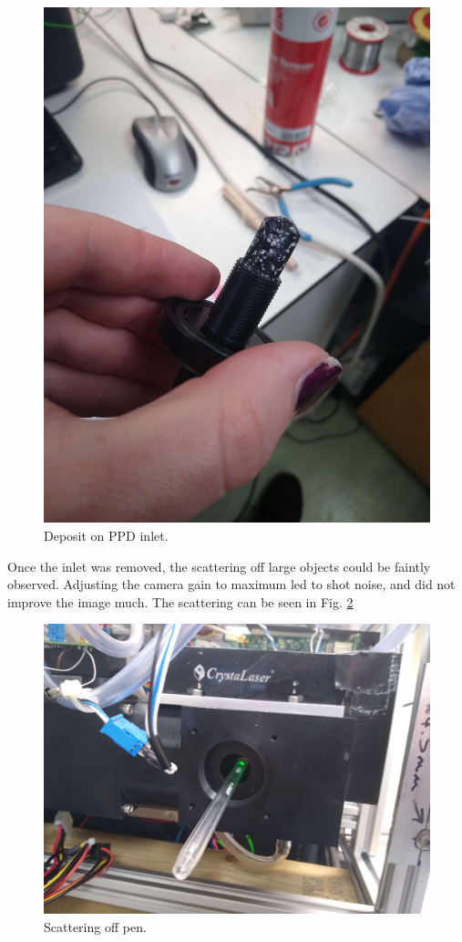 \begin{figure}[H]
\begin{center}
\includegraphics[width=0.5\linewidth]{Figures/PPDInletDeposit}
\end{center}
\caption{Deposit on PPD inlet.}
\label{fig:PPDInletDeposit}
\end{figure}

Once the inlet was removed, the scattering off large objects could be faintly observed. Adjusting the camera gain to maximum led to shot noise, and did not improve the image much. The scattering can be seen in Fig. \ref{fig:PPDPenScatter}

\begin{figure}[H]
\begin{center}
\includegraphics[width=0.5\linewidth]{Figures/PPDPenScatter}
\end{center}
\caption{Scattering off pen.}
\label{fig:PPDPenScatter}
\end{figure}
